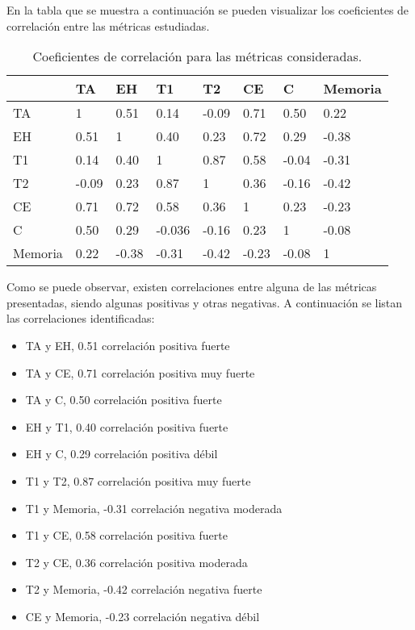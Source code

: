 En la tabla que se muestra a continuaci\'on se pueden visualizar los coeficientes de correlaci\'on entre las m\'etricas estudiadas.

\begin{table}[H]
\centering
\footnotesize
\begin{tabular}{|p{1.6cm}|p{1.6cm}|p{1.6cm}|p{1.6cm}|p{1.6cm}|p{1.6cm}|p{1.6cm}|p{1.6cm}|}
\hline
          &    TA & EH    & T1     & T2    & CE    & C      & Memoria \\
\hline
TA        & 1     & 0.51  & 0.14   & -0.09 & 0.71  & 0.50   & 0.22  \\
EH        & 0.51  & 1     & 0.40   & 0.23  & 0.72  & 0.29   & -0.38 \\
T1        & 0.14  & 0.40  & 1      & 0.87  & 0.58  & -0.04  & -0.31 \\
T2        & -0.09 & 0.23  & 0.87   & 1     & 0.36  & -0.16  & -0.42 \\
CE        & 0.71  & 0.72  & 0.58   & 0.36  & 1     & 0.23   & -0.23 \\
C         & 0.50  & 0.29  & -0.036 & -0.16 & 0.23  & 1      & -0.08 \\
Memoria   & 0.22  & -0.38 & -0.31  & -0.42 & -0.23 & -0.08  & 1     \\
\hline
\end{tabular}
\caption{Coeficientes de correlaci\'on para las m\'etricas consideradas.}
\label{sec:tabla-correlacion}
\end{table}

Como se puede observar, existen correlaciones entre alguna de las m\'etricas presentadas, 
siendo algunas positivas y otras negativas. A continuaci\'on se listan las correlaciones identificadas:

\begin{itemize}
    \item TA y EH, 0.51 correlaci\'on positiva fuerte
    \item TA y CE, 0.71 correlaci\'on positiva muy fuerte
    \item TA y C, 0.50 correlaci\'on positiva fuerte 
    \item EH y T1, 0.40 correlaci\'on positiva fuerte
    \item EH y C, 0.29 correlaci\'on positiva d\'ebil
    \item T1 y T2, 0.87 correlaci\'on positiva muy fuerte
    \item T1 y Memoria, -0.31 correlaci\'on negativa moderada
    \item T1 y CE, 0.58 correlaci\'on positiva fuerte
    \item T2 y CE, 0.36 correlaci\'on positiva moderada
    \item T2 y Memoria, -0.42 correlaci\'on negativa fuerte
    \item CE y Memoria, -0.23 correlaci\'on negativa d\'ebil
\end{itemize}
